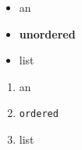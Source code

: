 \begin{itemize}
\item an
\item \textbf{unordered}
\item list
\end{itemize}
\begin{enumerate}
\item an
\item \texttt{ordered}
\item list
\end{enumerate}
